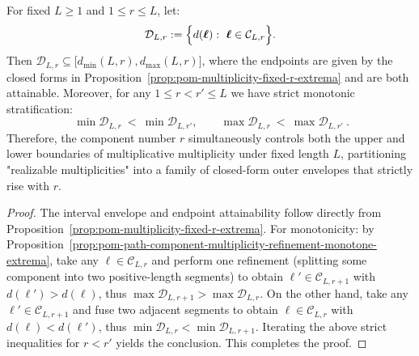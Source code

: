 \begin{corollary}\label{cor:pom-multiplicity-fixed-L-r-envelope}
For fixed $L\ge 1$ and $1\le r\le L$, let:
\[
\mathcal{D}_{L,r}:=\Bigl\{d(\boldsymbol{\ell}):\ \boldsymbol{\ell}\in\mathcal{C}_{L,r}\Bigr\}.
\]
Then $\mathcal{D}_{L,r}\subseteq\bigl[d_{\min}(L,r),d_{\max}(L,r)\bigr]$, where the endpoints are given by the closed forms in Proposition~\ref{prop:pom-multiplicity-fixed-r-extrema} and are both attainable.
Moreover, for any $1\le r<r'\le L$ we have strict monotonic stratification:
\[
\boxed{\ \min\mathcal{D}_{L,r}\ <\ \min\mathcal{D}_{L,r'},\qquad
\max\mathcal{D}_{L,r}\ <\ \max\mathcal{D}_{L,r'}\ } .
\]
Therefore, the component number $r$ simultaneously controls both the upper and lower boundaries of multiplicative multiplicity under fixed length $L$, partitioning "realizable multiplicities" into a family of closed-form outer envelopes that strictly rise with $r$.
\end{corollary}
\begin{proof}
The interval envelope and endpoint attainability follow directly from Proposition~\ref{prop:pom-multiplicity-fixed-r-extrema}.
For monotonicity: by Proposition~\ref{prop:pom-path-component-multiplicity-refinement-monotone-extrema}, take any $\boldsymbol{\ell}\in\mathcal{C}_{L,r}$ and perform one refinement (splitting some component into two positive-length segments) to obtain $\boldsymbol{\ell}'\in\mathcal{C}_{L,r+1}$ with $d(\boldsymbol{\ell}')>d(\boldsymbol{\ell})$, thus $\max\mathcal{D}_{L,r+1}>\max\mathcal{D}_{L,r}$.
On the other hand, take any $\boldsymbol{\ell}'\in\mathcal{C}_{L,r+1}$ and fuse two adjacent segments to obtain $\boldsymbol{\ell}\in\mathcal{C}_{L,r}$ with $d(\boldsymbol{\ell})<d(\boldsymbol{\ell}')$, thus $\min\mathcal{D}_{L,r}<\min\mathcal{D}_{L,r+1}$.
Iterating the above strict inequalities for $r<r'$ yields the conclusion. This completes the proof.
\end{proof}

